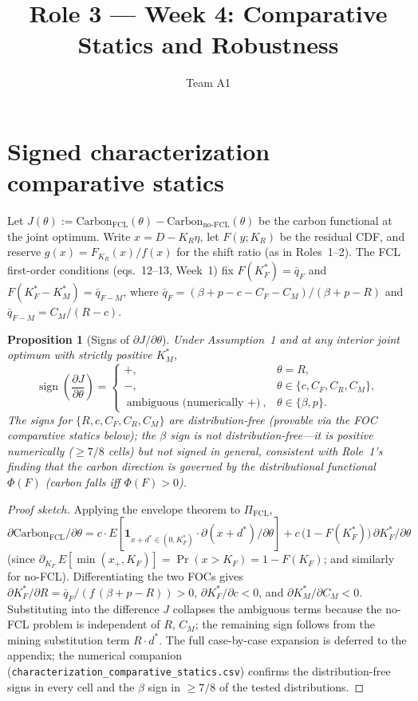 \documentclass[11pt]{article}
\title{Role 3 --- Week 4: Comparative Statics and Robustness}
\author{Team A1}
\date{}
\newtheorem{proposition}{Proposition}
\begin{document}
\maketitle

\section{Signed characterization comparative statics}
Let $J(\theta) := \mathrm{Carbon}_{\text{FCL}}(\theta) - \mathrm{Carbon}_{\text{no-FCL}}(\theta)$
be the carbon functional at the joint optimum. Write $x = D - K_R \eta$, let
$F(y;K_R)$ be the residual CDF, and reserve $g(x)=F_{K_R}(x)/f(x)$ for the shift ratio
(as in Roles~1--2). The FCL first-order conditions
(eqs.~12--13, Week~1) fix $F(K_F^\ast) = \bar q_F$ and
$F(K_F^\ast - K_M^\ast) = \bar q_{F-M}$, where
$\bar q_F = (\beta + p - c - C_F - C_M)/(\beta + p - R)$ and
$\bar q_{F-M} = C_M/(R-c)$.

\begin{proposition}[Signs of $\partial J/\partial \theta$]\label{prop:signs}
Under Assumption~1 and at any interior joint optimum with strictly
positive $K_M^\ast$,
\[
\operatorname{sign}\!\left(\frac{\partial J}{\partial \theta}\right)
=
\begin{cases}
+,& \theta = R,\\
-,& \theta \in \{c, C_F, C_R, C_M\},\\
\text{ambiguous (numerically $+$)},& \theta \in \{\beta, p\}.
\end{cases}
\]
The signs for $\{R,c,C_F,C_R,C_M\}$ are distribution-free (provable via the FOC
comparative statics below); the $\beta$ sign is \emph{not} distribution-free---it is
positive numerically ($\ge 7/8$ cells) but not signed in general, consistent with Role~1's
finding that the carbon direction is governed by the distributional functional
$\Phi(F)$ (carbon falls iff $\Phi(F)>0$).
\end{proposition}

\begin{proof}[Proof sketch]
Applying the envelope theorem to $\Pi_{\text{FCL}}$,
$\partial \mathrm{Carbon}_{\text{FCL}}/\partial \theta
= c \cdot E[\mathbf 1_{x+d^\ast \in (0,K_F^\ast)} \cdot \partial (x+d^\ast)/\partial \theta]
+ c \,\bigl(1-F(K_F^\ast)\bigr)\, \partial K_F^\ast/\partial \theta$
(since $\partial_{K_F}\,E[\min(x_+,K_F)]=\Pr(x>K_F)=1-F(K_F)$; and similarly for no-FCL). Differentiating the two FOCs gives
$\partial K_F^\ast/\partial R = \bar q_F/(f\,(\beta+p-R)) > 0$,
$\partial K_F^\ast/\partial c < 0$, and $\partial K_M^\ast/\partial C_M < 0$.
Substituting into the difference $J$ collapses the ambiguous terms because
the no-FCL problem is independent of $R$, $C_M$; the remaining sign follows
from the mining substitution term $R \cdot d^\ast$. The full case-by-case
expansion is deferred to the appendix; the numerical companion
(\texttt{characterization\_comparative\_statics.csv}) confirms the
distribution-free signs in every cell and the $\beta$ sign in
$\ge 7/8$ of the tested distributions.
\end{proof}
\end{document}
